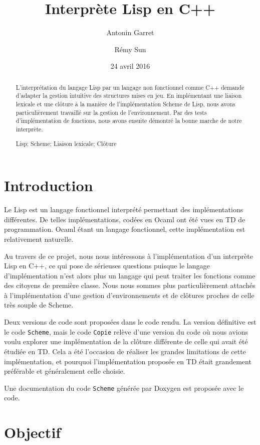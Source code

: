 \documentclass[a4paper,11pt]{article}
\title{Interprète Lisp en C++}
\author{Antonin Garret \and Rémy Sun}
\date{24 avril 2016}
\newenvironment{keywords}%
{\description\item[Mots-clés.]}%
{\enddescription}
\begin{document}
\maketitle

\begin{abstract}
  L'interprétation du langage Lisp par un langage non fonctionnel comme C++
  demande d'adapter la gestion intuitive des structures mises en jeu. En
  implémentant une liaison lexicale et une clôture à la manière de
  l'implémentation Scheme de Lisp, nous avons particulièrement travaillé sur la
  gestion de l'environnement. Par
  des tests d'implémentation de fonctions, nous avons ensuite démontré la bonne
  marche de notre interprète.
  \begin{keywords}
    Lisp; Scheme; Liaison lexicale; Clôture
  \end{keywords}
\end{abstract}

\section*{Introduction}

Le Lisp est un langage fonctionnel interprété permettant des implémentations
différentes. De telles implémentations, codées en Ocaml ont été vues en TD de
programmation. Ocaml étant un langage fonctionnel, cette implémentation est
relativement naturelle.

Au travers de ce projet, nous nous intéressons à l'implémentation d'un
interprète Lisp en C++, ce qui pose de sérieuses questions puisque le langage
d'implémentation n'est alors plus un langage qui peut traiter les fonctions
comme des citoyens de première classe. Nous nous sommes plus particulièrement attachés à
l'implémentation d'une gestion d'environnements et de clôtures proches de celle
très souple de Scheme. 

Deux versions de code sont proposées dans le code rendu. La version définitive
est le code \texttt{Scheme}, mais le code \texttt{Copie} relève d'une version du
code où nous avions voulu explorer une implémentation de la clôture différente de 
celle
qui avait été étudiée en TD. Cela a été l'occasion de réaliser les
grandes limitations de cette implémentation, et pourquoi l'implémentation
proposée en TD était grandement préférable et généralement celle choisie.

Une documentation du code \texttt{Scheme} générée par Doxygen est proposée avec
le code.

\section{Objectif}
\end{document}
